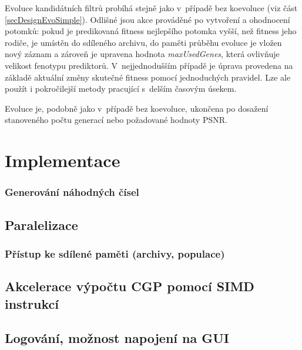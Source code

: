 Evoluce kandidátních filtrů probíhá stejně jako v~případě bez koevoluce (viz část \ref{secDesignEvoSimple}). Odlišné jsou akce prováděné po vytvoření a ohodnocení potomků: pokud je predikovaná fitness nejlepšího potomka vyšší, než fitness jeho rodiče, je umístěn do sdíleného archivu, do paměti průběhu evoluce je vložen nový záznam a zároveň je upravena hodnota \emph{maxUsedGenes}, která ovlivňuje velikost fenotypu prediktorů. V~nejjednodušším případě je úprava provedena na základě aktuální změny skutečné fitness pomocí jednoduchých pravidel. Lze ale použít i pokročilejší metody pracující s~delším časovým úsekem.

Evoluce je, podobně jako v~případě bez koevoluce, ukončena po dosažení stanoveného počtu generací nebo požadované hodnoty PSNR.


\chapter{Implementace}
\label{chImplementation}


\subsection{Generování náhodných čísel}

\section{Paralelizace}




\subsection{Přístup ke sdílené paměti (archivy, populace)}


\section{Akcelerace výpočtu CGP pomocí SIMD instrukcí}


\section{Logování, možnost napojení na GUI}


